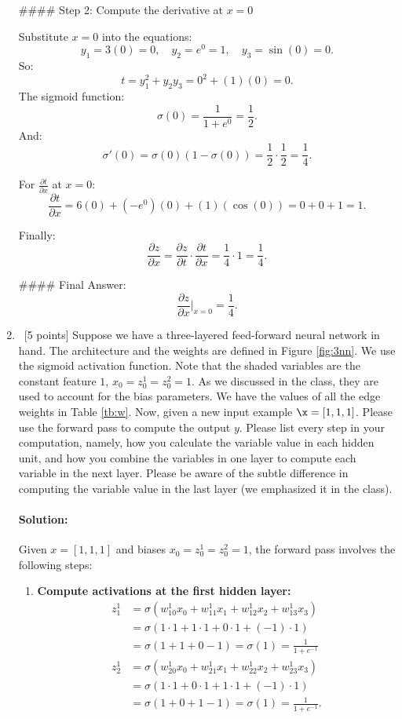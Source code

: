 \documentclass[12pt, fullpage,letterpaper]{article}
\begin{document}
\begin{enumerate}
#### Step 2: Compute the derivative at \(x = 0\)

Substitute \(x = 0\) into the equations:
\[
y_1 = 3(0) = 0, \quad y_2 = e^0 = 1, \quad y_3 = \sin(0) = 0.
\]
So:
\[
t = y_1^2 + y_2 y_3 = 0^2 + (1)(0) = 0.
\]
The sigmoid function:
\[
\sigma(0) = \frac{1}{1 + e^0} = \frac{1}{2}.
\]
And:
\[
\sigma'(0) = \sigma(0)(1 - \sigma(0)) = \frac{1}{2} \cdot \frac{1}{2} = \frac{1}{4}.
\]

For \(\frac{\partial t}{\partial x}\) at \(x = 0\):
\[
\frac{\partial t}{\partial x} = 6(0) + (-e^0)(0) + (1)(\cos(0)) = 0 + 0 + 1 = 1.
\]

Finally:
\[
\frac{\partial z}{\partial x} = \frac{\partial z}{\partial t} \cdot \frac{\partial t}{\partial x} = \frac{1}{4} \cdot 1 = \frac{1}{4}.
\]

#### Final Answer:
\[
\frac{\partial z}{\partial x} \Big|_{x=0} = \frac{1}{4}.
\]

	\item~[5 points] Suppose we have a three-layered feed-forward neural network in hand. The architecture and the weights are defined in Figure \ref{fig:3nn}. We use the sigmoid activation function. Note that the shaded variables are the constant feature $1$, \ie $x_0 = z_{0}^1 = z_{0}^2 = 1$. As we discussed in the class, they are used to account for the bias parameters. 
	We have the values of all the edge weights in Table \ref{tb:w}. Now, given a new input example $\x=[1, 1, 1]$. Please use the forward pass to compute the output $y$. Please list every step in your computation, namely, how you calculate the variable value in each hidden unit, and how  you combine the variables in one layer to compute each variable in the next layer. Please be aware of the subtle difference in computing the variable value in the last layer (we emphasized it in the class). 
\paragraph{Solution:}
Given $x = [1, 1, 1]$ and biases $x_0 = z_0^1 = z_0^2 = 1$, the forward pass involves the following steps:

\begin{enumerate}
    \item \textbf{Compute activations at the first hidden layer:}
    \begin{align*}
    z_1^1 &= \sigma(w_{10}^1x_0 + w_{11}^1x_1 + w_{12}^1x_2 + w_{13}^1x_3) \\
    &= \sigma(1 \cdot 1 + 1 \cdot 1 + 0 \cdot 1 + (-1) \cdot 1) \\
    &= \sigma(1 + 1 + 0 - 1) = \sigma(1) = \frac{1}{1 + e^{-1}} \\
    z_2^1 &= \sigma(w_{20}^1x_0 + w_{21}^1x_1 + w_{22}^1x_2 + w_{23}^1x_3) \\
    &= \sigma(1 \cdot 1 + 0 \cdot 1 + 1 \cdot 1 + (-1) \cdot 1) \\
    &= \sigma(1 + 0 + 1 - 1) = \sigma(1) = \frac{1}{1 + e^{-1}}.
    \end{align*}


\end{enumerate}
\end{enumerate}
\end{document}
